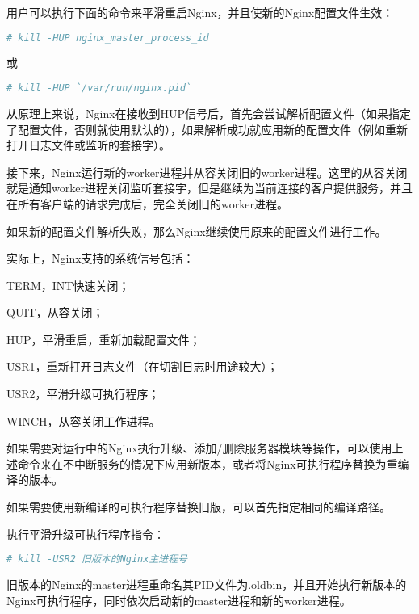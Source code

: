 用户可以执行下面的命令来平滑重启Nginx，并且使新的Nginx配置文件生效：

\begin{lstlisting}[language=bash]
# kill -HUP nginx_master_process_id
\end{lstlisting}

或

\begin{lstlisting}[language=bash]
# kill -HUP `/var/run/nginx.pid`
\end{lstlisting}

从原理上来说，Nginx在接收到HUP信号后，首先会尝试解析配置文件（如果指定了配置文件，否则就使用默认的），如果解析成功就应用新的配置文件（例如重新打开日志文件或监听的套接字）。

接下来，Nginx运行新的worker进程并从容关闭旧的worker进程。这里的从容关闭就是通知worker进程关闭监听套接字，但是继续为当前连接的客户提供服务，并且在所有客户端的请求完成后，完全关闭旧的worker进程。

如果新的配置文件解析失败，那么Nginx继续使用原来的配置文件进行工作。


实际上，Nginx支持的系统信号包括：

\begin{compactenum}
\item TERM，INT快速关闭；
\item QUIT，从容关闭；
\item HUP，平滑重启，重新加载配置文件；
\item USR1，重新打开日志文件（在切割日志时用途较大）；
\item USR2，平滑升级可执行程序；
\item WINCH，从容关闭工作进程。
\end{compactenum}


如果需要对运行中的Nginx执行升级、添加/删除服务器模块等操作，可以使用上述命令来在不中断服务的情况下应用新版本，或者将Nginx可执行程序替换为重编译的版本。

\begin{compactenum}
\item 如果需要使用新编译的可执行程序替换旧版，可以首先指定相同的编译路径。

\item 执行平滑升级可执行程序指令：

\begin{lstlisting}[language=bash]
# kill -USR2 旧版本的Nginx主进程号
\end{lstlisting}

\item 旧版本的Nginx的master进程重命名其PID文件为.oldbin，并且开始执行新版本的Nginx可执行程序，同时依次启动新的master进程和新的worker进程。

\end{compactenum}

